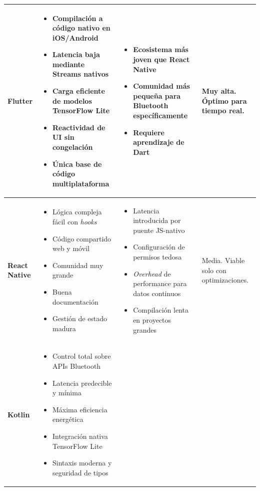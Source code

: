 \begin{xltabular}{\textwidth}{@{} >{\centering\arraybackslash}p{0.15\textwidth} >{\raggedright\arraybackslash}X >{\raggedright\arraybackslash}X >{\raggedright\arraybackslash}X @{}}
	\bottomrule
	\endlastfoot%
	\textbf{Flutter} &
	\begin{itemize}[nosep] \item Compilación a código nativo en iOS/Android \item Latencia baja mediante Streams nativos \item Carga eficiente de modelos TensorFlow Lite \item Reactividad de UI sin congelación \item Única base de código multiplataforma \end{itemize} &
	\begin{itemize}[nosep] \item Ecosistema más joven que React Native \item Comunidad más pequeña para Bluetooth específicamente \item Requiere aprendizaje de Dart \end{itemize} &
	 Muy alta. Óptimo para tiempo real. \\
	\midrule
	\textbf{React Native} &
	\begin{itemize}[nosep] \item Lógica compleja fácil con \textit{hooks} \item Código compartido web y móvil \item Comunidad muy grande \item Buena documentación \item Gestión de estado madura \end{itemize} &
	\begin{itemize}[nosep] \item Latencia introducida por puente JS-nativo \item Configuración de permisos tedosa \item \textit{Overhead} de performance para datos continuos \item Compilación lenta en proyectos grandes \end{itemize} &
	Media. Viable solo con optimizaciones. \\
	\midrule
	\textbf{Kotlin} &
	\begin{itemize}[nosep] \item Control total sobre APIs Bluetooth \item Latencia predecible y mínima \item Máxima eficiencia energética \item Integración nativa TensorFlow Lite \item Sintaxis moderna y seguridad de tipos \end{itemize} &

\end{xltabular}
